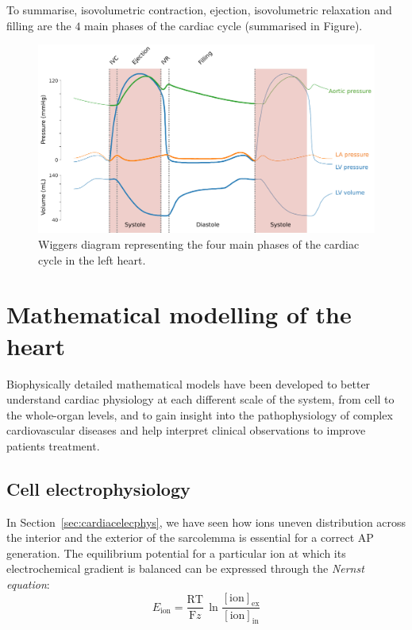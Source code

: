 \vspace{0.2cm}
To summarise, isovolumetric contraction, ejection, isovolumetric relaxation and filling are the $4$ main phases of the cardiac cycle (summarised in Figure).

\begin{figure}[!ht]
    \myfloatalign
    \includegraphics[width=\textwidth]{figures/chapter01/wiggers_diagram.pdf}
    \caption{Wiggers diagram representing the four main phases of the cardiac cycle in the left heart.}
    \label{fig:wiggersdiagram}
\end{figure}


%
%
%
\section{Mathematical modelling of the heart}
Biophysically detailed mathematical models have been developed to better understand cardiac physiology at each different scale of the system, from cell to the whole-organ levels, and to gain insight into the pathophysiology of complex cardiovascular diseases and help interpret clinical observations to improve patients treatment.


%
%
%
\subsection{Cell electrophysiology}
In Section~\ref{sec:cardiacelecphys}, we have seen how ions uneven distribution across the interior and the exterior of the sarcolemma is essential for a correct AP generation. The equilibrium potential for a particular ion at which its electrochemical gradient is balanced can be expressed through the \textit{Nernst equation}:
%
\begin{equation}\label{eq:nernsteq}
    E_{\textrm{ion}}=\frac{\textrm{R}\textrm{T}}{\textrm{F}z}\,\ln{\frac{[\textrm{ion}]_{\textrm{ex}}}{[\textrm{ion}]_{\textrm{in}}}}
\end{equation}

